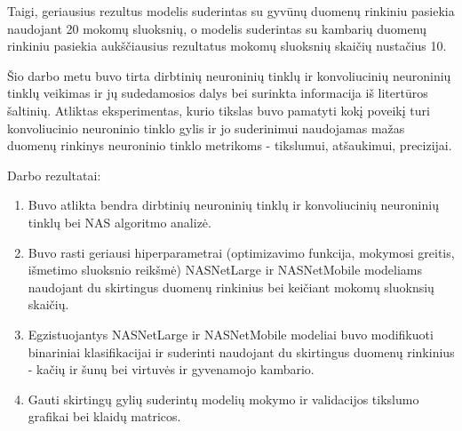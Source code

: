 \documentclass{VUMIFPSbakalaurinis}
\begin{document}
Taigi, geriausius rezultus modelis suderintas su gyvūnų duomenų rinkiniu pasiekia naudojant 20 mokomų sluoksnių, o modelis suderintas su kambarių duomenų rinkiniu pasiekia aukščiausius rezultatus mokomų sluoksnių skaičių nustačius 10.

Šio darbo metu buvo tirta dirbtinių neuroninių tinklų ir konvoliucinių neuroninių tinklų veikimas 
ir jų sudedamosios dalys bei surinkta informacija iš litertūros šaltinių. Atliktas eksperimentas, 
kurio tikslas buvo pamatyti kokį poveikį turi konvoliucinio neuroninio tinklo gylis ir jo suderinimui 
naudojamas mažas duomenų rinkinys neuroninio tinklo metrikoms - tikslumui, atšaukimui, precizijai.

Darbo rezultatai:
\begin{enumerate}
    \item Buvo atlikta bendra dirbtinių neuroninių tinklų ir konvoliucinių neuroninių tinklų bei NAS algoritmo analizė.
    \item Buvo rasti geriausi hiperparametrai (optimizavimo funkcija, mokymosi greitis, išmetimo sluoksnio reikšmė) NASNetLarge ir NASNetMobile modeliams naudojant du skirtingus duomenų rinkinius bei keičiant mokomų sluoknsių skaičių.
    \item Egzistuojantys NASNetLarge ir NASNetMobile modeliai buvo modifikuoti binariniai klasifikacijai ir suderinti naudojant du skirtingus duomenų rinkinius - kačių ir šunų bei virtuvės ir gyvenamojo kambario.
    \item Gauti skirtingų gylių suderintų modelių mokymo ir validacijos tikslumo grafikai bei klaidų matricos.
\end{enumerate}
\end{document}
